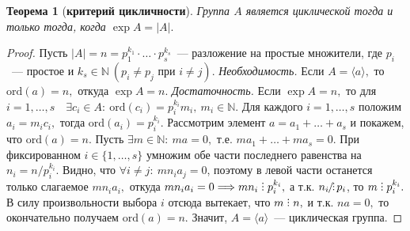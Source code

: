 \documentclass[a4paper, 14pt]{extarticle}
\newcommand{\naturals}{\mathbb{N}}
\newcommand{\ord}{\mathrm{ord}}
\newcommand{\suchthat}{{:}{ } \ }
\DeclareRobustCommand{\divby}{%
	\mathrel{\text{\vbox{\baselineskip.65ex\lineskiplimit0pt\hbox{.}\hbox{.}\hbox{.}}}}%
}
\DeclareRobustCommand{\ndivby}{%
	\mathrel{\text{%
			\vbox{\baselineskip.65ex\lineskiplimit0pt\hbox{.}\hbox{.}\hbox{.}}%
			\kern-1.5ex\hbox{/}%
	}}%
}
\theoremstyle{definition}
\theoremstyle{plain}
\newtheorem*{theorem*}{Теорема}
\numberwithin{theorem}{section}
\numberwithin{definition}{section}
\numberwithin{statement}{section}
\numberwithin{lemma}{section}
\numberwithin{consequence}{section}
\begin{document}
        \newpage
	\begin{theorem*}[\textbf{критерий цикличности}]
		Группа $A$ является циклической тогда и только тогда, когда ${\exp A = |A|.}$
	\end{theorem*}
	\begin{proof}
		Пусть ${|A| = n = p^{k_1}_1 \cdot \ldots \cdot p^{k_s}_s}$~--- разложение на простые множители, где $p_i$~--- простое и ${k_s \in \naturals \ (p_i \neq p_j \text{ при } i \neq j).}$ \newline
		{\textit{Необходимость.}} Если ${A = \langle a \rangle,}$ то ${\ord (a) = n,}$ откуда ${\exp A = n.}$ \newline
		{\textit{Достаточность.}} Если ${\exp A = n,}$ то для ${i = 1, \ldots, s \quad \exists c_i \in A \suchthat \ord(c_i) = p^{k_i}_i m_i, \ m_i \in \naturals.}$ Для каждого ${i = 1, \ldots, s}$ положим ${a_i = m_i c_i,}$ тогда ${\ord(a_i) = p^{k_i}_i.}$ Рассмотрим элемент ${a = a_1 + \ldots + a_s}$ и покажем, что ${\ord(a) = n.}$ Пусть ${\exists m \in \naturals \suchthat ma = 0,}$ т.е. ${ma_1 + \ldots + ma_s = 0.}$ При фиксированном ${i \in \{1, \ldots, s\}}$ умножим обе части последнего равенства на ${n_i = n/p^{k_i}_i.}$ Видно, что ${\forall i \neq j\suchthat mn_ia_j = 0}$, поэтому в левой части останется только слагаемое ${mn_ia_i,}$ откуда ${mn_ia_i = 0 \Longrightarrow mn_i \divby p^{k_i}_i,}$ а т.к. 
		${n_i \ndivby p_i}$, то ${m \divby p^{k_i}_i.}$  В силу произвольности выбора $i$ отсюда вытекает, что ${m \divby n,}$ и т.к. ${na = 0,}$ то окончательно получаем ${\ord(a) = n.}$ Значит, ${A = \langle a \rangle}$~--- циклическая группа.
	\end{proof}
    
        \newpage
\end{document}
